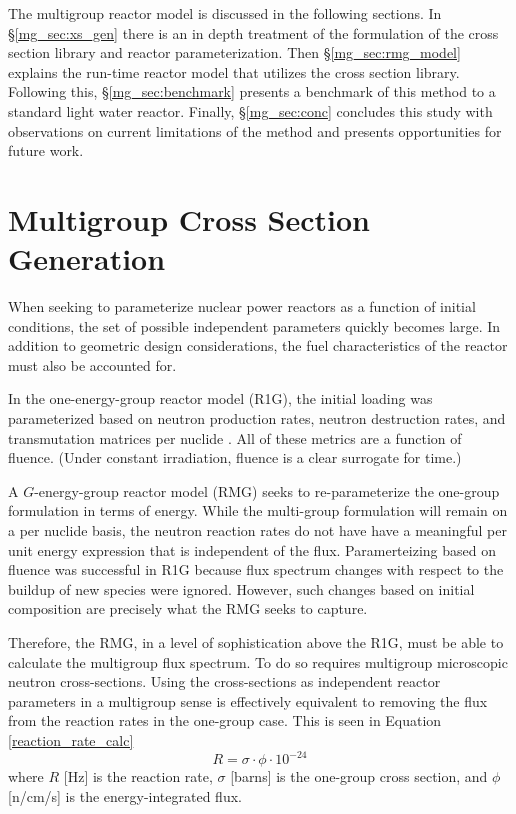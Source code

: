 The multigroup reactor model is discussed in the following sections.  In \S \ref{mg_sec:xs_gen} 
there is an in depth treatment of the formulation of the cross section library and reactor 
parameterization.  Then \S \ref{mg_sec:rmg_model} explains the run-time reactor model that 
utilizes the cross section library.  Following this, \S \ref{mg_sec:benchmark} presents a 
benchmark of this method to a standard light water reactor.  Finally, \S \ref{mg_sec:conc}
concludes this study with observations on current limitations of the method and presents 
opportunities for future work.


\section{Multigroup Cross Section Generation}
\label{mg_sec:xs_gen}
When seeking to parameterize nuclear power reactors as a function of initial conditions, 
the set of possible independent parameters quickly becomes large. In addition to geometric 
design considerations, the fuel characteristics of the reactor must also be accounted for.

In the one-energy-group reactor model (R1G), the initial loading was parameterized based
on neutron production rates, neutron destruction rates, and transmutation matrices per
nuclide \cite{Scopatz2009d}.  All of these metrics are a function of fluence.  (Under 
constant irradiation, fluence is a clear surrogate for time.)

A $G$-energy-group reactor model (RMG) seeks to re-parameterize the one-group formulation 
in terms of energy.  While the multi-group formulation will remain on a per nuclide basis, 
the neutron reaction rates do not have have a meaningful per unit energy expression that 
is independent of the flux.  Paramerteizing based on fluence was successful in R1G because 
flux spectrum changes with respect to the buildup of new species were ignored.   However, 
such changes based on initial composition are precisely what the RMG seeks to capture.

Therefore, the RMG, in a level of sophistication above the R1G, must be able to calculate
the multigroup flux spectrum.  To do so requires multigroup microscopic neutron cross-sections.  
Using the cross-sections as independent reactor parameters in a multigroup sense is 
effectively equivalent to removing the flux from the reaction rates in the one-group case.
This is seen in Equation \ref{reaction_rate_calc}
\begin{equation}
\label{reaction_rate_calc}
R = \sigma \cdot \phi \cdot 10^{-24}
\end{equation}
where $R$ [Hz] is the reaction rate, $\sigma$ [barns] is the one-group cross section, and
$\phi$ [n/cm/s] is the energy-integrated flux.

